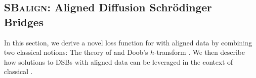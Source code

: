 %
%
%

\subsection{\textsc{SBalign}: Aligned Diffusion Schr\"odinger Bridges}

In this section, we derive a novel loss function for  with aligned data by combining two classical notions: The theory of  \citep{schrodinger1931umkehrung,leonard2013survey,chen2021stochastic} and Doob's $h$-transform \citep{doob1984classical, rogers2000diffusions}. We then describe how solutions to DSBs with aligned data can be leveraged in the context of classical .

